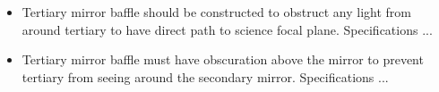 \documentclass{report}[12pt]
\begin{document}
\begin{itemize}
\begin{itemize}
\item Tertiary mirror baffle should be constructed to obstruct any light
from around tertiary to have direct path to science focal plane.
Specifications ...

\item Tertiary mirror baffle must have obscuration above the mirror to
prevent tertiary from seeing around the secondary mirror. Specifications
...

\end{itemize}


\end{itemize}
\end{document}
